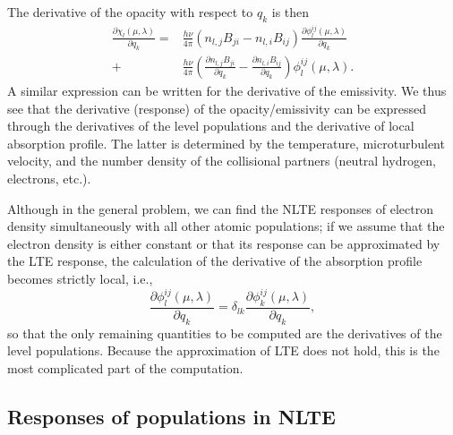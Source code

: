 \documentclass[referee]{aa}
\begin{document}
The derivative of the opacity with respect to $q_k$ is then
\begin{align}
  \frac{\partial \chi_l(\mu,\lambda)}{\partial q_k} = & \frac{h\nu}{4\pi}(n_{l,j} B_{ji} - n_{l,i}B_{ij}) \frac{\partial\phi^{ij}_l(\mu,\lambda)}{\partial q_k} \nonumber \\
 + & \frac{h\nu}{4\pi}(\frac{\partial n_{l,j} B_{ji}}{\partial q_k} - \frac{\partial n_{l,i}B_{ij}}{\partial q_k}) \phi^{ij}_l(\mu,\lambda).
 \label{chi_derivative}
\end{align}
A similar expression can be written for the derivative of the emissivity. We thus see that the derivative (response) of the opacity/emissivity can be expressed through the derivatives of the level populations and the derivative of local absorption profile. The latter is determined by the temperature, microturbulent velocity, and the number density of the collisional partners (neutral hydrogen, electrons, etc.). 

Although in the general problem, we can find the NLTE responses of electron density simultaneously with all other atomic populations; if we assume that the electron density is either constant or that its response can be approximated by the LTE response, the calculation of the derivative of the absorption profile becomes strictly local, i.e., 
\begin{equation}
 \frac{\partial\phi^{ij}_l(\mu,\lambda)}{\partial q_k} = \delta_{lk} \frac{\partial\phi^{ij}_k(\mu,\lambda)}{\partial q_k},
\end{equation}
so that the only remaining quantities to be computed are the derivatives of the level populations. Because the approximation of LTE does not hold, this is the most complicated part of the computation.

\subsection{Responses of populations in NLTE}
\label{nlte_lvls}
\end{document}
